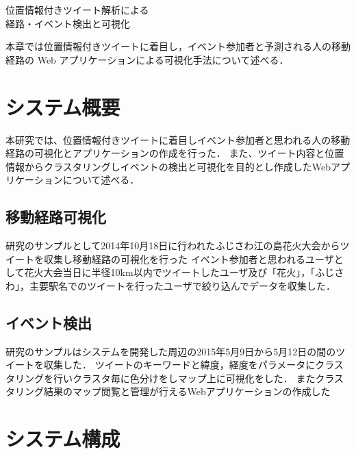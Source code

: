 \chapterhead
{位置情報付きツイート解析による\\
経路・イベント検出と可視化}

{本章では位置情報付きツイートに着目し，イベント参加者と予測される人の移動経路の Web アプリケーションによる可視化手法について述べる．}


\section{システム概要}
本研究では、位置情報付きツイートに着目しイベント参加者と思われる人の移動経路の可視化とアプリケーションの作成を行った．
また、ツイート内容と位置情報からクラスタリングしイベントの検出と可視化を目的とし作成したWebアプリケーションについて述べる．

 \subsection{移動経路可視化}
 研究のサンプルとして2014年10月18日に行われたふじさわ江の島花火大会\cite{webpage_fujisawa}からツイートを収集し移動経路の可視化を行った
 イベント参加者と思われるユーザとして花火大会当日に半径10km以内でツイートしたユーザ及び「花火」，「ふじさわ」，主要駅名でのツイートを行ったユーザで絞り込んでデータを収集した．



\subsection{イベント検出}
研究のサンプルはシステムを開発した周辺の2015年5月9日から5月12日の間のツイートを収集した．
ツイートのキーワードと緯度，経度をパラメータにクラスタリングを行いクラスタ毎に色分けをしマップ上に可視化をした．
またクラスタリング結果のマップ閲覧と管理が行えるWebアプリケーションの作成した




\newpage

\section{システム構成}
